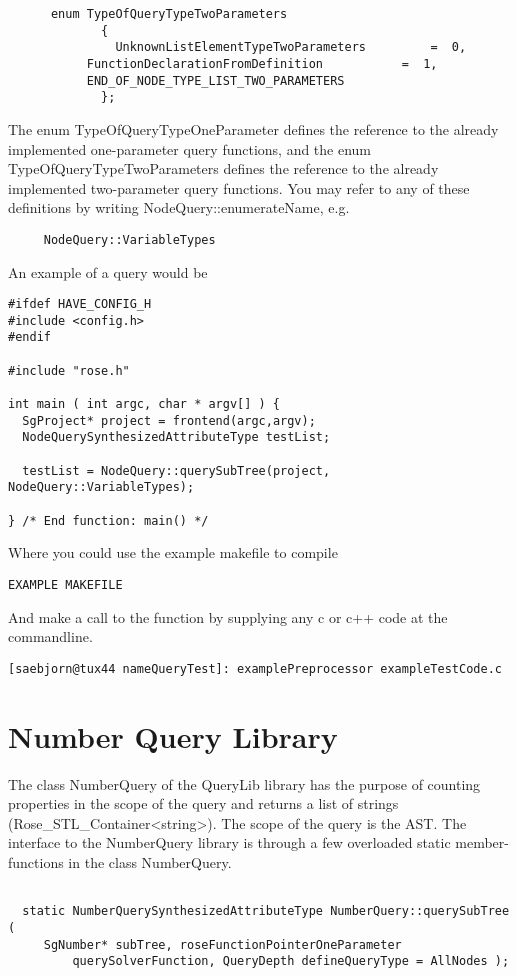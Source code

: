 {\begin{verbatim}
	  enum TypeOfQueryTypeTwoParameters
             {
               UnknownListElementTypeTwoParameters         =  0,
	       FunctionDeclarationFromDefinition           =  1,
	       END_OF_NODE_TYPE_LIST_TWO_PARAMETERS
             };
\end{verbatim}
The enum TypeOfQueryTypeOneParameter defines the reference to the
already implemented one-parameter query functions, and the enum 
TypeOfQueryTypeTwoParameters defines the reference to the already
implemented two-parameter query functions. You may refer to any of
these definitions by writing NodeQuery::enumerateName, e.g.
\begin{verbatim}
     NodeQuery::VariableTypes
\end{verbatim}
An example of a query would be 
\begin{verbatim}
#ifdef HAVE_CONFIG_H
#include <config.h>
#endif

#include "rose.h"

int main ( int argc, char * argv[] ) {
  SgProject* project = frontend(argc,argv);
  NodeQuerySynthesizedAttributeType testList;
  
  testList = NodeQuery::querySubTree(project, NodeQuery::VariableTypes);

} /* End function: main() */
\end{verbatim}
Where you could use the example makefile to compile
\begin{verbatim}
EXAMPLE MAKEFILE
\end{verbatim}
And make a call to the function by supplying any c or c++ code at the commandline.
\begin{verbatim}
[saebjorn@tux44 nameQueryTest]: examplePreprocessor exampleTestCode.c
\end{verbatim}

\section{Number Query Library}
 
The class NumberQuery of the QueryLib library has the purpose of
counting properties in the scope of the query and returns a list of
strings (Rose\_STL\_Container<string>). The scope of the query is
the AST. The interface to the NumberQuery library is through a few
overloaded static member-functions in the class NumberQuery.

\begin{verbatim}

  static NumberQuerySynthesizedAttributeType NumberQuery::querySubTree (
	 SgNumber* subTree, roseFunctionPointerOneParameter 
         querySolverFunction, QueryDepth defineQueryType = AllNodes );


\end{verbatim}}

